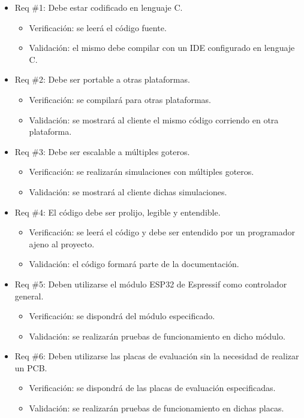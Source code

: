 \documentclass[
11pt, %
]{charter}
\begin{document}
\begin{itemize} 
\item Req \#1: Debe estar codificado en lenguaje C.
\begin{itemize}
	\item Verificación: se leerá el código fuente.
	\item Validación: el mismo debe compilar con un IDE configurado en lenguaje C.
\end{itemize}

\item Req \#2: Debe ser portable a otras plataformas.
\begin{itemize}
	\item Verificación: se compilará para otras plataformas.
	\item Validación: se mostrará al cliente el mismo código corriendo en otra plataforma.
\end{itemize}

\item Req \#3: Debe ser escalable a múltiples goteros.
\begin{itemize}
	\item Verificación: se realizarán simulaciones con múltiples goteros.
	\item Validación: se mostrará al cliente dichas simulaciones.
\end{itemize}

\item Req \#4: El código debe ser prolijo, legible y entendible.
\begin{itemize}
	\item Verificación: se leerá el código y debe ser entendido por un programador ajeno al proyecto.
	\item Validación: el código formará parte de la documentación.
\end{itemize}

\item Req \#5: Deben utilizarse el módulo ESP32 de Espressif como controlador general.
\begin{itemize}
	\item Verificación: se dispondrá del módulo especificado.
	\item Validación: se realizarán pruebas de funcionamiento en dicho módulo.
\end{itemize}

\item Req \#6: Deben utilizarse las placas de evaluación sin la necesidad de realizar un PCB.
\begin{itemize}
	\item Verificación: se dispondrá de las placas de evaluación especificadas.
	\item Validación: se realizarán pruebas de funcionamiento en dichas placas.
\end{itemize}


\end{itemize}
\end{document}
